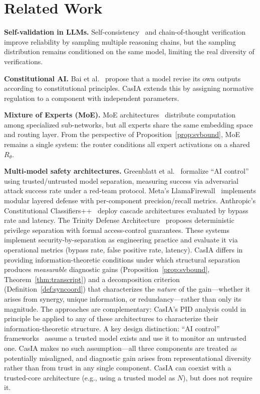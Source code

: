\documentclass[11pt,a4paper]{article}
\theoremstyle{definition}
\newcommand{\Rtheta}{R_\theta}
\begin{document}
\section{Related Work}
\label{sec:related}

\textbf{Self-validation in LLMs.} Self-consistency~\cite{wang2023selfconsistency} and chain-of-thought verification~\cite{weng2023selfverification} improve reliability by sampling multiple reasoning chains, but the sampling distribution remains conditioned on the same model, limiting the real diversity of verifications.

\textbf{Constitutional AI.} Bai et al.~\cite{bai2022constitutional} propose that a model revise its own outputs according to constitutional principles. CasIA extends this by assigning normative regulation to a component with independent parameters.

\textbf{Mixture of Experts (MoE).} MoE architectures~\cite{shazeer2017moe,fedus2022switch} distribute computation among specialized sub-networks, but all experts share the same embedding space and routing layer. From the perspective of Proposition~\ref{prop:svbound}, MoE remains a single system: the router conditions all expert activations on a shared $\Rtheta$.

\textbf{Multi-model safety architectures.} Greenblatt et al.~\cite{greenblatt2024control} formalize ``AI control'' using trusted/untrusted model separation, measuring success via adversarial attack success rate under a red-team protocol. Meta's LlamaFirewall~\cite{meta2025llamafirewall} implements modular layered defense with per-component precision/recall metrics. Anthropic's Constitutional Classifiers++~\cite{anthropic2026classifiers} deploy cascade architectures evaluated by bypass rate and latency. The Trinity Defense Architecture~\cite{bhattarai2025trinity} proposes deterministic privilege separation with formal access-control guarantees. These systems implement security-by-separation as engineering practice and evaluate it via operational metrics (bypass rate, false positive rate, latency). CasIA differs in providing information-theoretic conditions under which structural separation produces \emph{measurable} diagnostic gains (Proposition~\ref{prop:svbound}, Theorem~\ref{thm:transcript}) and a decomposition criterion (Definition~\ref{def:syncoord}) that characterizes the \emph{nature} of the gain---whether it arises from synergy, unique information, or redundancy---rather than only its magnitude. The approaches are complementary: CasIA's PID analysis could in principle be applied to any of these architectures to characterize their information-theoretic structure. A key design distinction: ``AI control'' frameworks~\cite{greenblatt2024control} assume a trusted model exists and use it to monitor an untrusted one. CasIA makes no such assumption---all three components are treated as potentially misaligned, and diagnostic gain arises from representational diversity rather than from trust in any single component. CasIA can coexist with a trusted-core architecture (e.g., using a trusted model as $N$), but does not require it.
\end{document}
